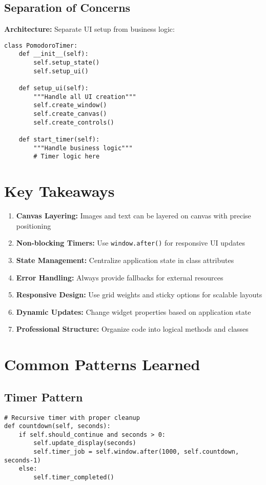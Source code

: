 \documentclass[12pt]{article}
\begin{document}
\subsection{Separation of Concerns}
\textbf{Architecture:} Separate UI setup from business logic:

\begin{lstlisting}
class PomodoroTimer:
    def __init__(self):
        self.setup_state()
        self.setup_ui()
    
    def setup_ui(self):
        """Handle all UI creation"""
        self.create_window()
        self.create_canvas()
        self.create_controls()
    
    def start_timer(self):
        """Handle business logic"""
        # Timer logic here
\end{lstlisting}

\section{Key Takeaways}

\begin{enumerate}[label=\textbf{\arabic*.}]
    \item \textbf{Canvas Layering:} Images and text can be layered on canvas with precise positioning
    \item \textbf{Non-blocking Timers:} Use \texttt{window.after()} for responsive UI updates
    \item \textbf{State Management:} Centralize application state in class attributes
    \item \textbf{Error Handling:} Always provide fallbacks for external resources
    \item \textbf{Responsive Design:} Use grid weights and sticky options for scalable layouts
    \item \textbf{Dynamic Updates:} Change widget properties based on application state
    \item \textbf{Professional Structure:} Organize code into logical methods and classes
\end{enumerate}

\section{Common Patterns Learned}

\subsection{Timer Pattern}
\begin{lstlisting}
# Recursive timer with proper cleanup
def countdown(self, seconds):
    if self.should_continue and seconds > 0:
        self.update_display(seconds)
        self.timer_job = self.window.after(1000, self.countdown, seconds-1)
    else:
        self.timer_completed()
\end{lstlisting}
\end{document}
